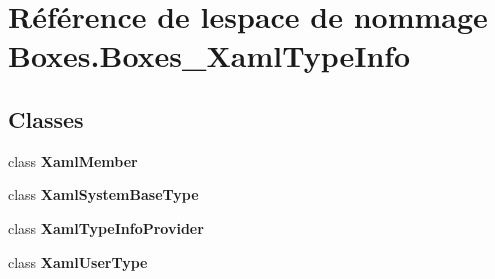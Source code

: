 \hypertarget{namespace_boxes_1_1_boxes___xaml_type_info}{}\section{Référence de l\textquotesingle{}espace de nommage Boxes.\+Boxes\+\_\+\+Xaml\+Type\+Info}
\label{namespace_boxes_1_1_boxes___xaml_type_info}
\subsection*{Classes}
\begin{DoxyCompactItemize}
\item 
class {\bfseries Xaml\+Member}
\item 
class {\bfseries Xaml\+System\+Base\+Type}
\item 
class {\bfseries Xaml\+Type\+Info\+Provider}
\item 
class {\bfseries Xaml\+User\+Type}
\end{DoxyCompactItemize}
